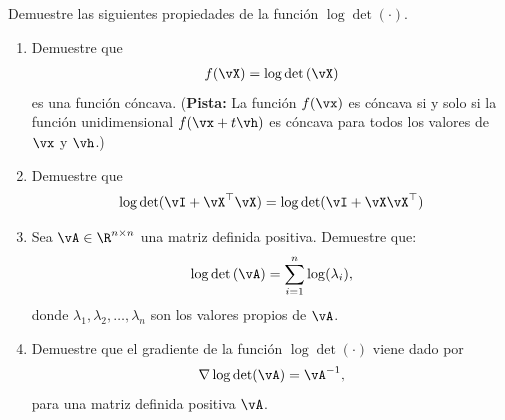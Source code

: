 \documentclass[../../book-main.tex]{subfiles}
\begin{document}
\begin{exercise}
    Demuestre las siguientes propiedades de la función  $\log\det(\cdot)$.
    \begin{enumerate}
        \item Demuestre que
            \begin{align*}
                f(\vX) = \log\det\left(\vX\right)
            \end{align*}
            es una función cóncava. ({\bf Pista:} La función $f(\vx)$ es
                cóncava si y solo si la función unidimensional $f(\vx+t\vh)$
            es cóncava para todos los valores de $\vx$ y $\vh$.)

        \item Demuestre que
            \begin{align*}
                \log\det(\vI + \vX^\top\vX) = \log\det(\vI + \vX\vX^\top)
            \end{align*}

        \item Sea $\vA \in \R^{n\times n}$ una matriz definida positiva.
            Demuestre que:
            \begin{align}
                \log\det\left(\vA \right) = \sum_{i=1}^n \log(\lambda_i),
            \end{align}
            donde $\lambda_1,\lambda_2,\dots,\lambda_n$ son los
            valores propios de $\vA$.

        \item Demuestre que el gradiente de la función $\log\det(\cdot)$
            viene dado por
            \begin{align*}
                \nabla \log\det(\vA) = \vA^{-1},
            \end{align*}
            para una matriz definida positiva $\vA$.

    \end{enumerate}

\end{exercise}

\end{document}
